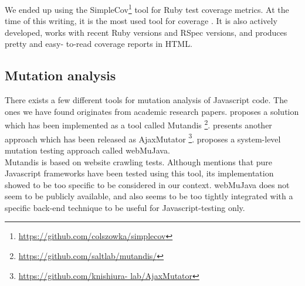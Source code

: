 We ended up using the
SimpleCov\footnote{\url{https://github.com/colszowka/simplecov}} tool
for Ruby test coverage metrics. At the time of this writing, it is the
most used tool for coverage . It is also actively developed, works with
recent Ruby versions and RSpec versions, and produces pretty and easy-
to-read coverage reports in HTML.\\


\subsection{Mutation analysis}

There exists a few different tools for mutation analysis of Javascript
code. The ones we have found originates from academic research papers.
\citet{paper:mutandis} proposes a solution which has been implemented as
a tool called Mutandis
\footnote{\url{https://github.com/saltlab/mutandis/}}.
\citet{paper:ajaxmutator} presents another approach which has been
released as AjaxMutator \footnote{\url{https://github.com/knishiura-
lab/AjaxMutator}}. \citet{paper:webmujava} proposes a system-level
mutation testing approach called webMuJava.\\

Mutandis is based on website crawling tests. Although
\citeauthor{paper:mutandis} mentions that pure Javascript frameworks
have been tested using this tool, its implementation showed to be too
specific to be considered in our context. webMuJava does not seem to be
publicly available, and also seems to be too tightly integrated with a
specific back-end technique to be useful for Javascript-testing only.
